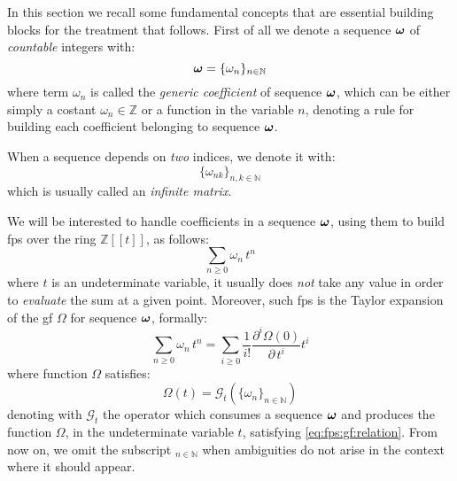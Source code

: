 
In this section we recall some fundamental concepts that are essential building
blocks for the treatment that follows. First of all we denote a sequence
$\boldsymbol{\omega}$ of \emph{countable} integers with:
\begin{displaymath}
    \boldsymbol{\omega}=\lbrace \omega_{n} \rbrace_{n\in\mathbb{N}}
\end{displaymath}
where term $\omega_{n}$ is called the \emph{generic coefficient} of
sequence $\boldsymbol{\omega}$, which can be either simply a costant $\omega_{n}\in\mathbb{Z}$
or a function in the variable $n$, denoting a rule for building each
coefficient belonging to sequence $\boldsymbol{\omega}$.

When a sequence depends on \emph{two} indices, we denote it with:
\begin{displaymath}
    \lbrace \omega_{nk} \rbrace_{n,k\in\mathbb{N}}
\end{displaymath}
which is usually called an \emph{infinite matrix}.

We will be interested to handle coefficients in a sequence $\boldsymbol{\omega}$,
using them to build \ac{fps} over the ring $\mathbb{Z}[\![t]\!]$, as follows:
\begin{equation}
    \sum_{n\geq0}{\omega_{n}\,t^{n}}
    \label{eq:fps:formally}
\end{equation}
where $t$ is an undeterminate variable, it usually does \emph{not} take
any value in order to \emph{evaluate} the sum at a given point. 
Moreover, such \ac{fps} is the Taylor expansion of the \ac{gf}
$\Omega$ for sequence $\boldsymbol{\omega}$, formally:
\begin{equation}
    \sum_{n\geq0}{\omega_{n}\,t^{n}} = \sum_{i\geq0}{\frac{1}{i!}\frac{
        \partial^{i}\Omega(0)}{\partial\,t^{i}}t^{i}}
    \label{eq:fps:gf:relation}
\end{equation}
where function $\Omega$ satisfies:
\begin{displaymath}
    \Omega(t) = \mathcal{G}_{t}\left(\lbrace\omega_{n}\rbrace_{n\in\mathbb{N}}\right)
\end{displaymath}
denoting with $\mathcal{G}_{t}$ the operator which consumes a sequence
$\boldsymbol{\omega}$ and produces the function $\Omega$, in the undeterminate
variable $t$, satisfying \autoref{eq:fps:gf:relation}. From now on, we
omit the subscript $_{n\in\mathbb{N}}$ when ambiguities do not arise 
in the context where it should appear.

